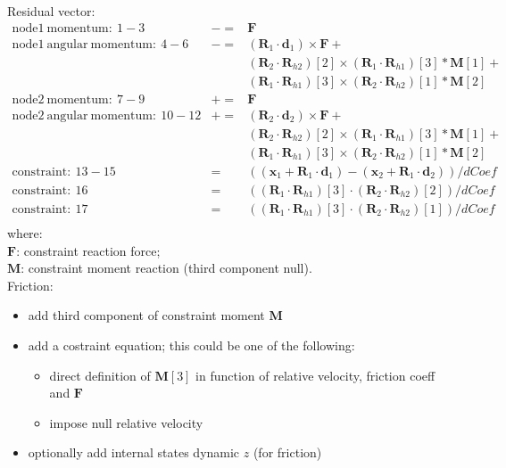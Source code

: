 \documentclass[10pt,dvips]{report}
\newcommand{\T}[1]{\boldsymbol{#1}}
\begin{document}
\noindent
Residual vector:
\begin{eqnarray*}
	\mathrm{node1\ momentum}:\ 1-3& -= & \T F\\
	\mathrm{node1\ angular\ momentum}:\ 4-6& -= & 
		(\T R_1\cdot \T d_1) \times \T F + \\
	&&	(\T R_2\cdot \T R_{h2})[2]\times 
		(\T R_1\cdot \T R_{h1})[3]*\T M[1] +\\
	&&	(\T R_1\cdot \T R_{h1})[3]\times
		(\T R_2\cdot \T R_{h2})[1]*\T M[2]\\
	\mathrm{node2\ momentum}:\ 7-9& += & \T F\\
	\mathrm{node2\ angular\ momentum}:\ 10-12& += & 
		(\T R_2\cdot \T d_2) \times \T F + \\
	&&	(\T R_2\cdot \T R_{h2})[2]\times 
		(\T R_1\cdot \T R_{h1})[3]*\T M[1] +\\
	&&	(\T R_1\cdot \T R_{h1})[3]\times
		(\T R_2\cdot \T R_{h2})[1]*\T M[2]\\
	\mathrm{constraint}:\ 13-15& = &  ((\T x_1+\T R_1\cdot \T d_1) - 
			(\T x_2+\T R_1\cdot \T d_2))/dCoef\\
	\mathrm{constraint}:\ 16& = &  ((\T R_1\cdot \T R_{h1})[3]\cdot 
			(\T R_2\cdot \T R_{h2})[2])/dCoef\\
	\mathrm{constraint}:\ 17& = &  ((\T R_1\cdot \T R_{h1})[3]\cdot 
			(\T R_2\cdot \T R_{h2})[1])/dCoef\\
\end{eqnarray*}
where:\\
$\T F$: constraint reaction force;\\
$\T M$: constraint moment reaction (third component null).\\

\noindent
Friction:
\begin{itemize}
\item add third component of constraint moment $\T M$
\item add a costraint equation; this could be one of the following:
	\begin{itemize}
	\item direct definition of $\T M[3]$ in function of relative velocity,
		friction coeff and $\T F$
	\item impose null relative velocity
	\end{itemize}
\item optionally add internal states dynamic $z$ (for friction)
\end{itemize}
\end{document}
